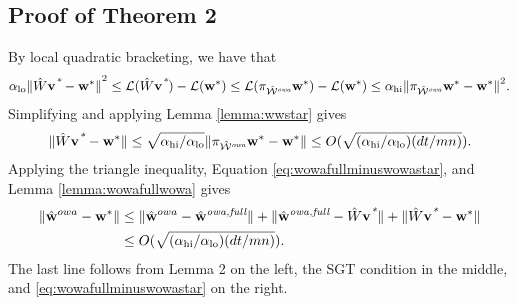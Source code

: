 \documentclass[thesis.tex]{subfiles}
\newcommand{\qhi}{\alpha_\text{hi}}
\newcommand{\qlo}{\alpha_\text{lo}}
\begin{document}
\subsection*{Proof of Theorem 2}
By local quadratic bracketing, we have that
\begin{align*}
\qlo\ltwo{\matW\vstar-\wstar}^2
\le
\Loss(\matW\vstar) - \Loss(\wstar)
\le
\Loss(\proj{\Wowa}\wstar) - \Loss(\wstar)
\le
\qhi\ltwo{\proj{\Wowa}\wstar-\wstar}^2
.
\end{align*}
Simplifying and applying Lemma \ref{lemma:wwstar} gives
\begin{equation}
    \label{eq:wowafullminuswowastar}
\ltwo{\matW\vstar-\wstar} 
\le \sqrt{{\qhi}/{\qlo}}\ltwo{\proj{\Wowa}\wstar-\wstar}
\le O(\sqrt{(\qhi/\qlo)(dt/mn)})
.
\end{equation}
Applying the triangle inequality, Equation \eqref{eq:wowafullminuswowastar}, and Lemma \ref{lemma:wowafullwowa} gives
\begin{align}
    \ltwo{\wowa-\wstar}
    &\le
    \ltwo{\wowa-\wowafull}+\ltwo{\wowafull-\matW\vstar}+\ltwo{\matW\vstar-\wstar}
    \\&\le
    O(\sqrt{(\qhi/\qlo)(dt/mn)})
    .
\end{align}
The last line follows from Lemma 2 on the left, the SGT condition%
in the middle,
and \eqref{eq:wowafullminuswowastar} on the right.
\end{document}
